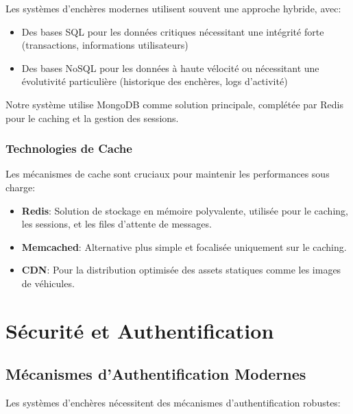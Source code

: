 Les systèmes d'enchères modernes utilisent souvent une approche hybride, avec:

\begin{itemize}
    \item Des bases SQL pour les données critiques nécessitant une intégrité forte (transactions, informations utilisateurs)
    \item Des bases NoSQL pour les données à haute vélocité ou nécessitant une évolutivité particulière (historique des enchères, logs d'activité)
\end{itemize}

Notre système utilise MongoDB comme solution principale, complétée par Redis pour le caching et la gestion des sessions.

\subsubsection{Technologies de Cache}

Les mécanismes de cache sont cruciaux pour maintenir les performances sous charge:

\begin{itemize}
    \item \textbf{Redis}: Solution de stockage en mémoire polyvalente, utilisée pour le caching, les sessions, et les files d'attente de messages.
    
    \item \textbf{Memcached}: Alternative plus simple et focalisée uniquement sur le caching.
    
    \item \textbf{CDN}: Pour la distribution optimisée des assets statiques comme les images de véhicules.
\end{itemize}

\section{Sécurité et Authentification}

\subsection{Mécanismes d'Authentification Modernes}

Les systèmes d'enchères nécessitent des mécanismes d'authentification robustes:


